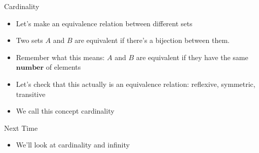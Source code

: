\documentclass{beamer}
\begin{document}
\begin{frame}{Cardinality}
\begin{itemize}
\item Let's make an equivalence relation between different sets
\item Two sets $A$ and $B$ are equivalent if there's a bijection between them.
\item Remember what this means: $A$ and $B$ are equivalent if they have the same $\mathbf{number}$ of elements
\item Let's check that this actually is an equivalence relation: reflexive, symmetric, transitive
\item We call this concept cardinality
\end{itemize}
\end{frame}

\begin{frame}{Next Time}
\begin{itemize}
\item We'll look at cardinality and infinity
\end{itemize}
\end{frame}
\end{document}
